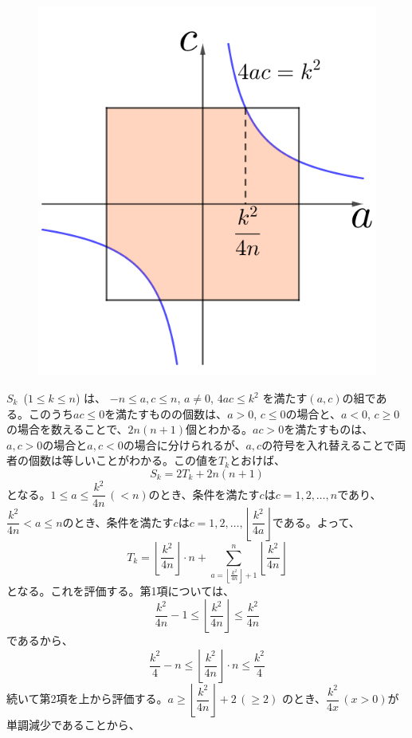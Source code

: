 \begin{figure}
 \centering
 \includegraphics[width=\linewidth]{../problems/Q_108/A_108.png}
\end{figure}
$S_k$~($1\le k\le n$) は、 $-n\le a, c\le n$, $a\neq 0$, $4ac\le k^2$ を満たす$(a, c)$の組である。このうち$ac\le 0$を満たすものの個数は、$a>0$, $c\le 0$の場合と、$a<0$, $c\ge 0$の場合を数えることで、$2n(n+1)$個とわかる。$ac>0$を満たすものは、$a, c>0$の場合と$a, c<0$の場合に分けられるが、$a, c$の符号を入れ替えることで両者の個数は等しいことがわかる。この値を$T_k$とおけば、
\[ S_k=2T_k+2n(n+1) \]
となる。$1\le a\le \dfrac{k^2}{4n}\,(<n)$のとき、条件を満たす$c$は$c=1, 2, \dots, n$であり、$\dfrac{k^2}{4n}<a\le n$のとき、条件を満たす$c$は$c=1, 2, \dots, \left\lfloor\dfrac{k^2}{4a}\right\rfloor$である。よって、
\[ T_k=\left\lfloor\frac{k^2}{4n}\right\rfloor\cdot n+\sum_{a=\left\lfloor\frac{k^2}{4n}\right\rfloor+1}^n \left\lfloor\frac{k^2}{4n}\right\rfloor \]
となる。これを評価する。第1項については、
\[ \frac{k^2}{4n}-1 \le \left\lfloor\frac{k^2}{4n}\right\rfloor \le \frac{k^2}{4n} \]
であるから、
\[ \frac{k^2}{4}-n \le \left\lfloor\frac{k^2}{4n}\right\rfloor\cdot n\le \frac{k^2}{4} \]
続いて第2項を上から評価する。$a\ge \left\lfloor\dfrac{k^2}{4n}\right\rfloor+2\,(\ge 2)$ のとき、$\dfrac{k^2}{4x}\,(x>0)$が単調減少であることから、
